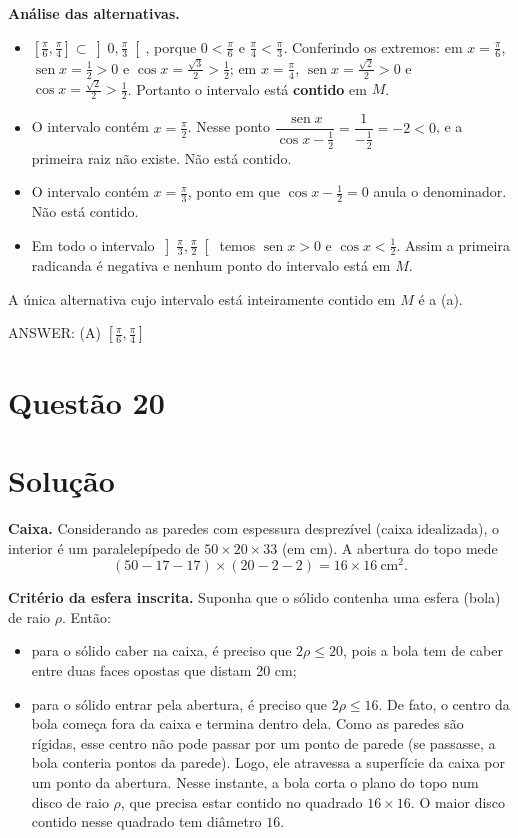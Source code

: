 \documentclass{article}%
\begin{document}
\textbf{Análise das alternativas.}
\begin{itemize}
\item[a)] $\left[\frac{\pi}{6},\frac{\pi}{4}\right]\subset\left]0,\frac{\pi}{3}\right[$, porque $0<\frac{\pi}{6}$ e $\frac{\pi}{4}<\frac{\pi}{3}$. Conferindo os extremos: em $x=\frac{\pi}{6}$, $\operatorname{sen} x=\frac12>0$ e $\cos x=\frac{\sqrt3}{2}>\frac12$; em $x=\frac{\pi}{4}$, $\operatorname{sen} x=\frac{\sqrt2}{2}>0$ e $\cos x=\frac{\sqrt2}{2}>\frac12$. Portanto o intervalo está \textbf{contido} em $M$.
\item[b)] O intervalo contém $x=\frac{\pi}{2}$. Nesse ponto $\dfrac{\operatorname{sen} x}{\cos x-\frac12}=\dfrac{1}{-\frac12}=-2<0$, e a primeira raiz não existe. Não está contido.
\item[c)] O intervalo contém $x=\frac{\pi}{3}$, ponto em que $\cos x-\frac12=0$ anula o denominador. Não está contido.
\item[d)] Em todo o intervalo $\left]\frac{\pi}{3},\frac{\pi}{2}\right[$ temos $\operatorname{sen} x>0$ e $\cos x<\frac12$. Assim a primeira radicanda é negativa e nenhum ponto do intervalo está em $M$.
\end{itemize}

A única alternativa cujo intervalo está inteiramente contido em $M$ é a (a).

ANSWER: (A) $\left[\frac{\pi}{6},\frac{\pi}{4}\right]$%
\newpage%
\section*{Questão 20}

\section*{Solução}

\textbf{Caixa.} Considerando as paredes com espessura desprezível (caixa idealizada), o interior é um paralelepípedo de $50\times 20\times 33$ (em cm). A abertura do topo mede
\[
(50-17-17)\times(20-2-2)=16\times 16\ \text{cm}^2 .
\]

\textbf{Critério da esfera inscrita.} Suponha que o sólido contenha uma esfera (bola) de raio $\rho$. Então:
\begin{itemize}
\item[(i)] para o sólido caber na caixa, é preciso que $2\rho\le 20$, pois a bola tem de caber entre duas faces opostas que distam 20 cm;
\item[(ii)] para o sólido entrar pela abertura, é preciso que $2\rho\le 16$. De fato, o centro da bola começa fora da caixa e termina dentro dela. Como as paredes são rígidas, esse centro não pode passar por um ponto de parede (se passasse, a bola conteria pontos da parede). Logo, ele atravessa a superfície da caixa por um ponto da abertura. Nesse instante, a bola corta o plano do topo num disco de raio $\rho$, que precisa estar contido no quadrado $16\times16$. O maior disco contido nesse quadrado tem diâmetro $16$.
\end{itemize}
\end{document}
